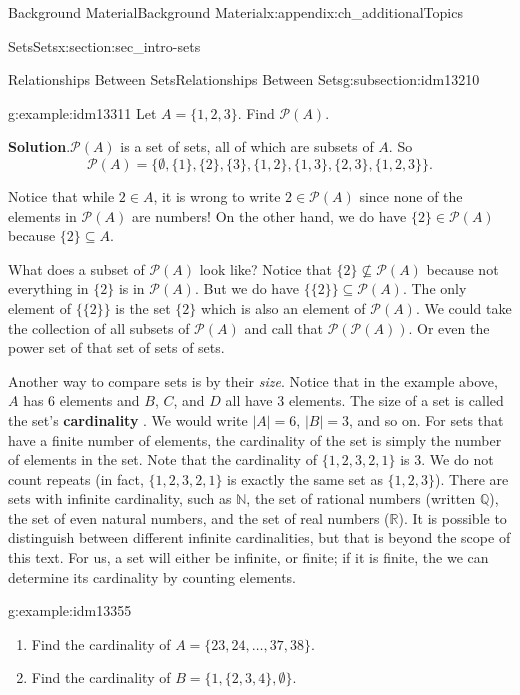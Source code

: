 \documentclass[oneside,10pt,]{book}
\newcommand{\terminology}[1]{\textbf{#1}}
\numberwithin{equation}{chapter}
\def\N{\mathbb N}
\def\pow{\mathcal P}
\begin{document}
\begin{appendixptx}{Background Material}{}{Background Material}{}{}{x:appendix:ch_additionalTopics}
\begin{sectionptx}{Sets}{}{Sets}{}{}{x:section:sec_intro-sets}
\begin{subsectionptx}{Relationships Between Sets}{}{Relationships Between Sets}{}{}{g:subsection:idm13210}
\begin{example}{}{g:example:idm13311}%
Let \(A = \{1,2,3\}\). Find \(\pow(A)\).%
\par\smallskip%
\noindent\textbf{Solution}.\hypertarget{g:solution:idm13316}{}\quad{}\(\pow(A)\) is a set of sets, all of which are subsets of \(A\). So%
\begin{equation*}
\pow(A) = \{ \emptyset, \{1\}, \{2\}, \{3\}, \{1,2\}, \{1, 3\}, \{2,3\}, \{1,2,3\}\}.
\end{equation*}
%
\par
Notice that while \(2 \in A\), it is wrong to write \(2 \in \pow(A)\) since none of the elements in \(\pow(A)\) are numbers! On the other hand, we do have \(\{2\} \in \pow(A)\) because \(\{2\} \subseteq A\).%
\par
What does a subset of \(\pow(A)\) look like? Notice that \(\{2\} \not\subseteq \pow(A)\) because not everything in \(\{2\}\) is in \(\pow(A)\). But we do have \(\{ \{2\} \} \subseteq \pow(A)\). The only element of \(\{\{2\}\}\) is the set \(\{2\}\) which is also an element of \(\pow(A)\). We could take the collection of all subsets of \(\pow(A)\) and call that \(\pow(\pow(A))\). Or even the power set of that set of sets of sets.%
\end{example}
Another way to compare sets is by their \emph{size}. Notice that in the example above, \(A\) has 6 elements and \(B\), \(C\), and \(D\) all have 3 elements. The size of a set is called the set's \terminology{cardinality} . We would write \(|A| = 6\), \(|B| = 3\), and so on. For sets that have a finite number of elements, the cardinality of the set is simply the number of elements in the set. Note that the cardinality of \(\{ 1, 2, 3, 2, 1\}\) is 3. We do not count repeats (in fact, \(\{1, 2, 3, 2, 1\}\) is exactly the same set as \(\{1, 2, 3\}\)). There are sets with infinite cardinality, such as \(\N\), the set of rational numbers (written \(\mathbb Q\)), the set of even natural numbers, and the set of real numbers (\(\mathbb R\)). It is possible to distinguish between different infinite cardinalities, but that is beyond the scope of this text. For us, a set will either be infinite, or finite; if it is finite, the we can determine its cardinality by counting elements.%
\begin{example}{}{g:example:idm13355}%
%
\begin{enumerate}
\item{}Find the cardinality of \(A = \{23, 24, \ldots, 37, 38\}\).%
\item{}Find the cardinality of \(B = \{1, \{2, 3, 4\}, \emptyset\}\).%

\end{enumerate}
\end{example}
\end{subsectionptx}
\end{sectionptx}
\end{appendixptx}
\end{document}
